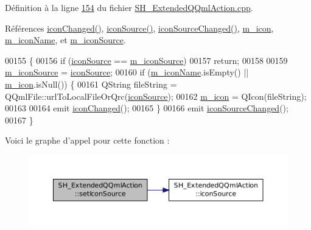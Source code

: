 Définition à la ligne \hyperlink{SH__ExtendedQQmlAction_8cpp_source_l00154}{154} du fichier \hyperlink{SH__ExtendedQQmlAction_8cpp_source}{S\-H\-\_\-\-Extended\-Q\-Qml\-Action.\-cpp}.



Références \hyperlink{classSH__ExtendedQQmlAction_ac47156b58d63ae5408e8d06b3669005c}{icon\-Changed()}, \hyperlink{classSH__ExtendedQQmlAction_a4256635783087124d3df6fa9726e7d55}{icon\-Source()}, \hyperlink{classSH__ExtendedQQmlAction_a86d7d90947e9dcd0d80faba2734f580e}{icon\-Source\-Changed()}, \hyperlink{classSH__ExtendedQQmlAction_a4386f56e28c2c70cfedd16c1d8c2c4a4}{m\-\_\-icon}, \hyperlink{classSH__ExtendedQQmlAction_a3375d1504e5ec862ed05500bf529d95c}{m\-\_\-icon\-Name}, et \hyperlink{classSH__ExtendedQQmlAction_a61c8633eab1fa3b69752074220e785fc}{m\-\_\-icon\-Source}.


\begin{DoxyCode}
00155 \{
00156     \textcolor{keywordflow}{if} (\hyperlink{classSH__ExtendedQQmlAction_a4256635783087124d3df6fa9726e7d55}{iconSource} == \hyperlink{classSH__ExtendedQQmlAction_a61c8633eab1fa3b69752074220e785fc}{m\_iconSource})
00157         \textcolor{keywordflow}{return};
00158 
00159     \hyperlink{classSH__ExtendedQQmlAction_a61c8633eab1fa3b69752074220e785fc}{m\_iconSource} = \hyperlink{classSH__ExtendedQQmlAction_a4256635783087124d3df6fa9726e7d55}{iconSource};
00160     \textcolor{keywordflow}{if} (\hyperlink{classSH__ExtendedQQmlAction_a3375d1504e5ec862ed05500bf529d95c}{m\_iconName}.isEmpty() || \hyperlink{classSH__ExtendedQQmlAction_a4386f56e28c2c70cfedd16c1d8c2c4a4}{m\_icon}.isNull()) \{
00161         QString fileString = QQmlFile::urlToLocalFileOrQrc(\hyperlink{classSH__ExtendedQQmlAction_a4256635783087124d3df6fa9726e7d55}{iconSource});
00162         \hyperlink{classSH__ExtendedQQmlAction_a4386f56e28c2c70cfedd16c1d8c2c4a4}{m\_icon} = QIcon(fileString);
00163 
00164         emit \hyperlink{classSH__ExtendedQQmlAction_ac47156b58d63ae5408e8d06b3669005c}{iconChanged}();
00165     \}
00166     emit \hyperlink{classSH__ExtendedQQmlAction_a86d7d90947e9dcd0d80faba2734f580e}{iconSourceChanged}();
00167 \}
\end{DoxyCode}


Voici le graphe d'appel pour cette fonction \-:\nopagebreak
\begin{figure}[H]
\begin{center}
\leavevmode
\includegraphics[width=350pt]{classSH__ExtendedQQmlAction_a703b29eb866cdc4d739e3f22ada92fb6_cgraph}
\end{center}
\end{figure}



